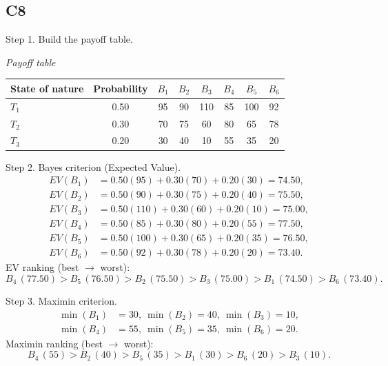 \begin{ExamProblems}
		\subsection*{C8}
		Step 1. Build the payoff table.
		\begin{center}
			\textit{Payoff table} \\
			\begin{tabular}{l c c c c c c c}
				\toprule
				State of nature & Probability & $B_1$ & $B_2$ & $B_3$ & $B_4$ & $B_5$ & $B_6$ \\
				\midrule
				$T_1$ & 0.50 & 95 & 90 & 110 & 85 & 100 & 92 \\
				$T_2$ & 0.30 & 70 & 75 & 60 & 80 & 65 & 78 \\
				$T_3$ & 0.20 & 30 & 40 & 10 & 55 & 35 & 20 \\
				\bottomrule
			\end{tabular}
		\end{center}

		Step 2. Bayes criterion (Expected Value).
		\[
		\begin{aligned}
		EV(B_1)&=0.50(95)+0.30(70)+0.20(30)=74.50,\\
		EV(B_2)&=0.50(90)+0.30(75)+0.20(40)=75.50,\\
		EV(B_3)&=0.50(110)+0.30(60)+0.20(10)=75.00,\\
		EV(B_4)&=0.50(85)+0.30(80)+0.20(55)=77.50,\\
		EV(B_5)&=0.50(100)+0.30(65)+0.20(35)=76.50,\\
		EV(B_6)&=0.50(92)+0.30(78)+0.20(20)=73.40.
		\end{aligned}
		\]
		EV ranking (best $\to$ worst):
		\[
		B_4\,(77.50)>B_5\,(76.50)>B_2\,(75.50)>B_3\,(75.00)>B_1\,(74.50)>B_6\,(73.40).
		\]

		Step 3. Maximin criterion.
		\[
		\begin{aligned}
		\min(B_1)&=30,\ \min(B_2)=40,\ \min(B_3)=10,\\
		\min(B_4)&=55,\ \min(B_5)=35,\ \min(B_6)=20.
		\end{aligned}
		\]
		Maximin ranking (best $\to$ worst):
		\[
		B_4\,(55)>B_2\,(40)>B_5\,(35)>B_1\,(30)>B_6\,(20)>B_3\,(10).
		\]


\end{ExamProblems}
